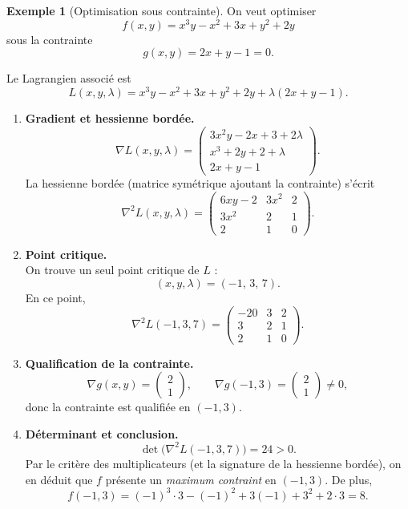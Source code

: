 \documentclass[a4paper,12pt,openany]{book}
\theoremstyle{plain}
\theoremstyle{definition}
\newtheorem{example}[theorem]{Exemple}
\theoremstyle{remark}
\theoremstyle{nbstyle}
\begin{document}
	\begin{example}[Optimisation sous contrainte]\label{eq3.5}
		On veut optimiser
		\[
		f(x,y)=x^{3}y - x^{2} + 3x + y^{2} + 2y
		\]
		sous la contrainte
		\[
		g(x,y)=2x+y-1=0.
		\]
		
		Le Lagrangien associé est
		\[
		L(x,y,\lambda)=x^{3}y - x^{2} + 3x + y^{2} + 2y + \lambda(2x+y-1).
		\]
		
		\begin{enumerate}
			\item \textbf{Gradient et hessienne bordée.} \\
			\[
			\nabla L(x,y,\lambda)=
			\begin{pmatrix}
			3x^{2}y - 2x + 3 + 2\lambda\\[4pt]
			x^{3} + 2y + 2 + \lambda\\[4pt]
			2x + y - 1
			\end{pmatrix}.
			\]
			La hessienne bordée (matrice symétrique ajoutant la contrainte) s'écrit
			\[
			\nabla^{2}L(x,y,\lambda)=
			\begin{pmatrix}
			6xy - 2 & 3x^{2} & 2 \\[4pt]
			3x^{2}  & 2      & 1 \\[4pt]
			2      & 1      & 0
			\end{pmatrix}.
			\]
			
			\item \textbf{Point critique.} \\
			On trouve un seul point critique de $L$ :
			\[
			(x,y,\lambda)=(-1,\,3,\,7).
			\]
			En ce point,
			\[
			\nabla^{2}L(-1,3,7)=
			\begin{pmatrix}
			-20 & 3 & 2 \\[4pt]
			3  & 2 & 1 \\[4pt]
			2  & 1 & 0
			\end{pmatrix}.
			\]
			
			\item \textbf{Qualification de la contrainte.} \\
			\[
			\nabla g(x,y)=\begin{pmatrix}2\\[2pt]1\end{pmatrix},
			\qquad \nabla g(-1,3)=\begin{pmatrix}2\\[2pt]1\end{pmatrix}\neq 0,
			\]
			donc la contrainte est qualifiée en $(-1,3)$.
			
			\item \textbf{Déterminant et conclusion.} \\
			\[
			\det\!\big(\nabla^{2}L(-1,3,7)\big)=24>0.
			\]
			Par le critère des multiplicateurs (et la signature de la hessienne bordée), on en déduit que $f$ présente un \emph{maximum contraint} en $( -1,3)$.  
			De plus,
			\[
			f(-1,3)=(-1)^{3}\cdot 3 - (-1)^{2} + 3(-1) + 3^{2} + 2\cdot 3 = 8.
			\]
		\end{enumerate}
	\end{example}
	
\end{document}
